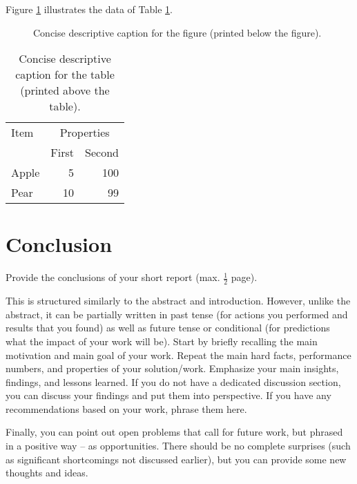 \documentclass[11pt,
  titlepage=false,
]{scrreprt}
\begin{document}
Figure \ref{fig:diagram} illustrates the data of Table \ref{tab:data}.

\begin{figure}[htpb]
  \centering
  \caption{Concise descriptive caption for the figure (printed below the figure).}
  \label{fig:diagram}
\end{figure}

\begin{table}[b]
  \caption{Concise descriptive caption for the table (printed above the table).}
  \label{tab:data}
  \centering
  \begin{tabular}{lrr} %
    \toprule
    Item   & \multicolumn{2}{c}{Properties} \\
             \cmidrule{2-3}
           & First          & Second \\
    \midrule
    Apple  & 5              & 100 \\
    Pear   & 10             & 99 \\
    \bottomrule
  \end{tabular}
\end{table}



\chapter{Conclusion}
\label{chap:conclusion}

Provide the conclusions of your short report (max. $\frac{1}{2}$ page).

This is structured similarly to the abstract and introduction.
However, unlike the abstract, it can be partially written in past tense (for actions you performed and results that you found) as well as future tense or conditional (for predictions what the impact of your work will be).
Start by briefly recalling the main motivation and main goal of your work.
Repeat the main hard facts, performance numbers, and properties of your solution/work.
%
Emphasize your main insights, findings, and lessons learned.
If you do not have a dedicated discussion section, you can discuss your findings and put them into perspective.
If you have any recommendations based on your work, phrase them here.

Finally, you can point out open problems that call for future work, but phrased in a positive way -- as opportunities.
There should be no complete surprises (such as significant shortcomings not discussed earlier), but you can provide some new thoughts and ideas.



\printbibliography
\end{document}
